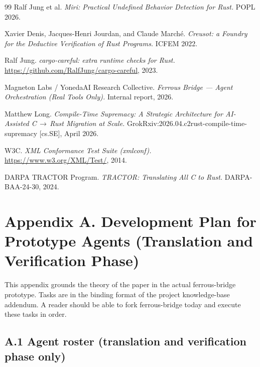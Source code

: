 \documentclass[12pt]{article}
\theoremstyle{definition}
\theoremstyle{remark}
\begin{document}
\begin{thebibliography}{99}
Ralf Jung et al.
\emph{Miri: Practical Undefined Behavior Detection for Rust.}
POPL 2026.

Xavier Denis, Jacques-Henri Jourdan, and Claude March\'e.
\emph{Creusot: a Foundry for the Deductive Verification of Rust
Programs.} ICFEM 2022.

Ralf Jung. \emph{cargo-careful: extra runtime checks for Rust.}
\url{https://github.com/RalfJung/cargo-careful}, 2023.

Magneton Labs / YonedaAI Research Collective.
\emph{Ferrous Bridge --- Agent Orchestration (Real Tools Only).}
Internal report, 2026.

Matthew Long. \emph{Compile-Time Supremacy: A Strategic Architecture
for AI-Assisted C\,$\to$\,Rust Migration at Scale.}
GrokRxiv:2026.04.c2rust-compile-time-supremacy [cs.SE], April 2026.

W3C. \emph{XML Conformance Test Suite (xmlconf).}
\url{https://www.w3.org/XML/Test/}, 2014.

DARPA TRACTOR Program.
\emph{TRACTOR: Translating All C to Rust.}
DARPA-BAA-24-30, 2024.
\end{thebibliography}

\appendix

{}
\label{app:devplan}
\section*{Appendix A. Development Plan for Prototype Agents (Translation and Verification Phase)}

This appendix grounds the theory of the paper in the actual
ferrous-bridge prototype. Tasks are in the binding format of the
project knowledge-base addendum. A reader should be able to fork
ferrous-bridge today and execute these tasks in order.

\subsection*{A.1 Agent roster (translation and verification phase only)}
\end{document}
